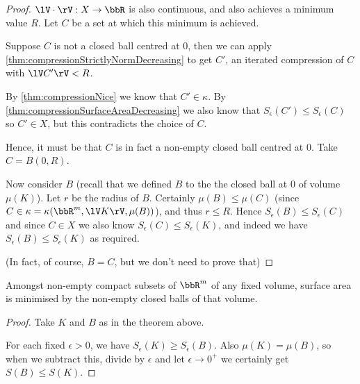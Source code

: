 \documentclass[a4paper,11pt]{article}
\begin{document}
\begin{proof}
$\lV\cdot\rV:X\to\bbR$ is also continuous, and also achieves a minimum value
$R$.  Let $C$ be a set at which this minimum is achieved.

Suppose $C$ is not a closed ball centred at $0$, then we can apply
\ref{thm:compressionStrictlyNormDecreasing} to get $C'$, an iterated
compression of $C$ with $\lV C'\rV<R$.

By \ref{thm:compressionNice} we know that $C'\in\kappa$.
By \ref{thm:compressionSurfaceAreaDecreasing} we also know that
$S_\epsilon(C')\leq S_\epsilon(C)$ so $C'\in X$, but this contradicts the
choice of $C$.

Hence, it must be that $C$ is in fact a non-empty closed ball centred at $0$.
Take $C=B(0,R)$.

Now consider $B$ (recall that we defined $B$ to the the closed ball at $0$ of
volume $\mu(K)$).  Let $r$ be the radius of $B$.  Certainly $\mu(B)\leq\mu(C)$
(since $C\in\kappa=\kappa(\bbR^m,\lV K\rV,\mu(B))$), and thus
$r\leq R$.  Hence $S_\epsilon(B)\leq S_\epsilon(C)$ and since $C\in X$ we also
know $S_\epsilon(C)\leq S_\epsilon(K)$, and indeed we have
$S_\epsilon(B)\leq S_\epsilon(K)$ as required.

(In fact, of course, $B=C$, but we don't need to prove that)
\end{proof}

\begin{corollary}
Amongst non-empty compact subsets of $\bbR^m$ of any fixed volume, surface area
is minimised by the non-empty closed balls of that volume.
\end{corollary}

\begin{proof}
Take $K$ and $B$ as in the theorem above.

For each fixed $\epsilon>0$, we have $S_\epsilon(K)\geq S_\epsilon(B)$.  Also
$\mu(K)=\mu(B)$, so when we subtract this, divide by $\epsilon$
and let $\epsilon\to0^+$ we certainly
get $S(B)\leq S(K)$.
\end{proof}

\begin{comment}
\begin{corollary}
Combining this with \ref{thm:smoothSurfaceAreas}, we deduce that amongst all
smooth compact submainfolds (with boundary) of $\bbR^m$ of dimension $m$ of any
fixed volume, closed balls minimise surface area.
\end{corollary}
\end{comment}
\end{document}
